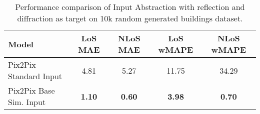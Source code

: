 		\begin{table}[h!]
			\centering
			\begin{tabular}{|l|c|c|c|c|}
				\hline
				\textbf{Model} & \textbf{LoS MAE} & \textbf{NLoS MAE} & \textbf{LoS wMAPE} & \textbf{NLoS wMAPE} \\
				\hline
				Pix2Pix Standard Input & 4.81 & 5.27 & 11.75 & 34.29 \\
				Pix2Pix Base Sim. Input & \textbf{1.10} & \textbf{0.60} & \textbf{3.98} & \textbf{0.70} \\
				\hline
			\end{tabular}
			\caption{Performance comparison of Input Abstraction with reflection and diffraction as target on 10k random generated buildings dataset.}
			\label{tab:performance_input_ref_diff}
		\end{table}
		
		\newpage
		
